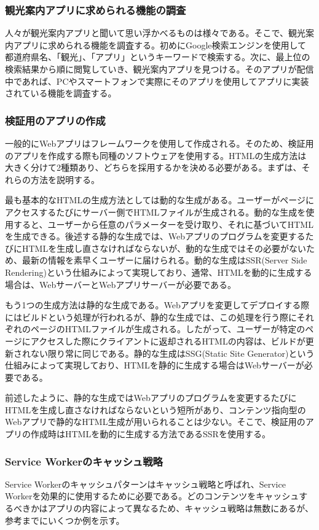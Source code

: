 \subsubsection{観光案内アプリに求められる機能の調査}\label{subsubsection:観光案内アプリに求められる機能の調査}
人々が観光案内アプリと聞いて思い浮かべるものは様々である。そこで、観光案内アプリに求められる機能を調査する。初めにGoogle検索エンジンを使用して都道府県名、「観光」、「アプリ」というキーワードで検索する。次に、最上位の検索結果から順に閲覧していき、観光案内アプリを見つける。そのアプリが配信中であれば、PCやスマートフォンで実際にそのアプリを使用してアプリに実装されている機能を調査する。
\subsubsection{検証用のアプリの作成}\label{subsubsection:検証用のアプリの作成}
一般的にWebアプリはフレームワークを使用して作成される。そのため、検証用のアプリを作成する際も同種のソフトウェアを使用する。HTMLの生成方法は大きく分けて2種類あり、どちらを採用するかを決める必要がある。まずは、それらの方法を説明する。

最も基本的なHTMLの生成方法としては動的な生成がある。ユーザーがページにアクセスするたびにサーバー側でHTMLファイルが生成される。動的な生成を使用すると、ユーザーから任意のパラメーターを受け取り、それに基づいてHTMLを生成できる。後述する静的な生成では、Webアプリのプログラムを変更するたびにHTMLを生成し直さなければならないが、動的な生成ではその必要がないため、最新の情報を素早くユーザーに届けられる。動的な生成はSSR(Server Side Rendering)という仕組みによって実現しており、通常、HTMLを動的に生成する場合は、WebサーバーとWebアプリサーバーが必要である。

もう1つの生成方法は静的な生成である。Webアプリを変更してデプロイする際にはビルドという処理が行われるが、静的な生成では、この処理を行う際にそれぞれのページのHTMLファイルが生成される。したがって、ユーザーが特定のページにアクセスした際にクライアントに返却されるHTMLの内容は、ビルドが更新されない限り常に同じである。静的な生成はSSG(Static Site Generator)という仕組みによって実現しており、HTMLを静的に生成する場合はWebサーバーが必要である。

前述したように、静的な生成ではWebアプリのプログラムを変更するたびにHTMLを生成し直さなければならないという短所があり、コンテンツ指向型のWebアプリで静的なHTML生成が用いられることは少ない。そこで、検証用のアプリの作成時はHTMLを動的に生成する方法であるSSRを使用する。

\subsubsection{Service Workerのキャッシュ戦略}\label{Service Workerのキャッシュパターン}
Service Workerのキャッシュパターンはキャッシュ戦略と呼ばれ、Service Workerを効果的に使用するために必要である。どのコンテンツをキャッシュするべきかはアプリの内容によって異なるため、キャッシュ戦略は無数にあるが、参考までにいくつか例を示す。

